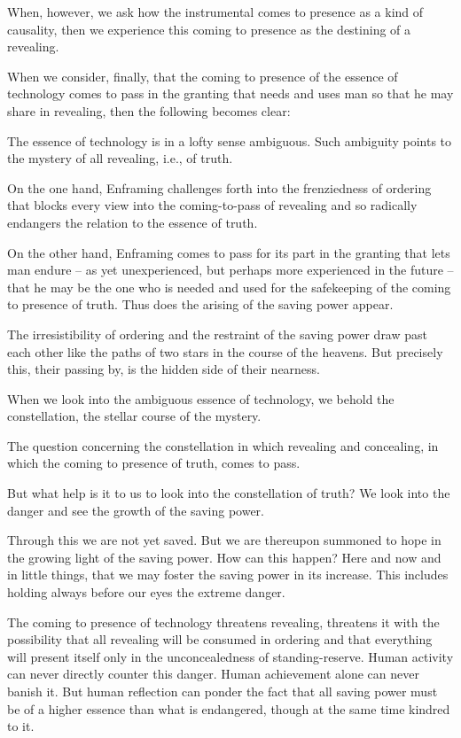 When, however, we ask how the instrumental comes to presence as a kind of causality, then we experience this coming to presence as the destining of a revealing.

When we consider, finally, that the coming to presence of the essence of technology comes to pass in the granting that needs and uses man so that he may share in revealing, then the following becomes clear:

The essence of technology is in a lofty sense ambiguous. Such ambiguity points to the mystery of all revealing, i.e., of truth.

On the one hand, Enframing challenges forth into the frenziedness of ordering that blocks every view into the coming-to-pass of revealing and so radically endangers the relation to the essence of truth.

On the other hand, Enframing comes to pass for its part in the granting that lets man endure -- as yet unexperienced, but perhaps more experienced in the future -- that he may be the one who is needed and used for the safekeeping of the coming to presence of truth. Thus does the arising of the saving power appear.

The irresistibility of ordering and the restraint of the saving power draw past each other like the paths of two stars in the course of the heavens. But precisely this, their passing by, is the hidden side of their nearness.

When we look into the ambiguous essence of technology, we behold the constellation, the stellar course of the mystery.

The question concerning the constellation in which revealing and concealing, in which the coming to presence of truth, comes to pass.

But what help is it to us to look into the constellation of truth? We look into the danger and see the growth of the saving power.

Through this we are not yet saved. But we are thereupon summoned to hope in the growing light of the saving power. How can this happen? Here and now and in little things, that we may foster the saving power in its increase. This includes holding always before our eyes the extreme danger.

The coming to presence of technology threatens revealing, threatens it with the possibility that all revealing will be consumed in ordering and that everything will present itself only in the unconcealedness of standing-reserve. Human activity can never directly counter this danger. Human achievement alone can never banish it. But human reflection can ponder the fact that all saving power must be of a higher essence than what is endangered, though at the same time kindred to it.

